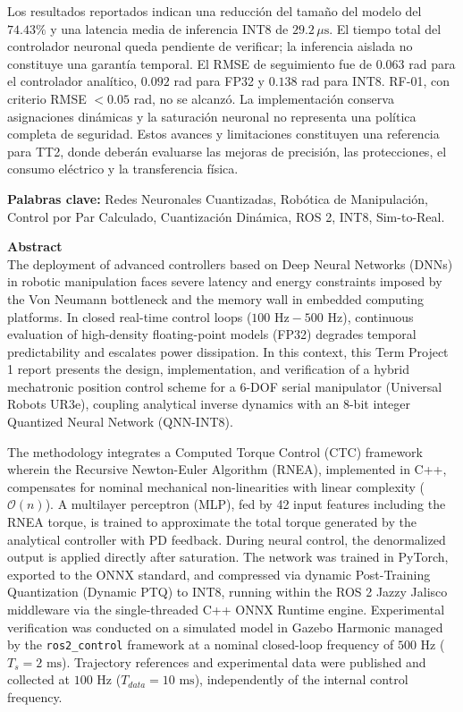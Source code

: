 \documentclass[12pt]{article}
\begin{document}
Los resultados reportados indican una reducción del tamaño del modelo del $74.43\%$ y una latencia media de inferencia INT8 de $29.2\,\mu\text{s}$. El tiempo total del controlador neuronal queda pendiente de verificar; la inferencia aislada no constituye una garantía temporal. El RMSE de seguimiento fue de $0.063$ rad para el controlador analítico, $0.092$ rad para FP32 y $0.138$ rad para INT8. RF-01, con criterio RMSE $<0.05$ rad, no se alcanzó. La implementación conserva asignaciones dinámicas y la saturación neuronal no representa una política completa de seguridad. Estos avances y limitaciones constituyen una referencia para TT2, donde deberán evaluarse las mejoras de precisión, las protecciones, el consumo eléctrico y la transferencia física.

\vspace{0.6cm}
\textbf{Palabras clave:} Redes Neuronales Cuantizadas, Robótica de Manipulación, Control por Par Calculado, Cuantización Dinámica, ROS 2, INT8, Sim-to-Real.

\vspace{1.0cm}
{\large \textbf{Abstract}}\\
The deployment of advanced controllers based on Deep Neural Networks (DNNs) in robotic manipulation faces severe latency and energy constraints imposed by the Von Neumann bottleneck and the memory wall in embedded computing platforms. In closed real-time control loops ($100\text{ Hz} - 500\text{ Hz}$), continuous evaluation of high-density floating-point models (FP32) degrades temporal predictability and escalates power dissipation. In this context, this Term Project 1 report presents the design, implementation, and verification of a hybrid mechatronic position control scheme for a 6-DOF serial manipulator (Universal Robots UR3e), coupling analytical inverse dynamics with an 8-bit integer Quantized Neural Network (QNN-INT8).

The methodology integrates a Computed Torque Control (CTC) framework wherein the Recursive Newton-Euler Algorithm (RNEA), implemented in C++, compensates for nominal mechanical non-linearities with linear complexity ($\mathcal{O}(n)$). A multilayer perceptron (MLP), fed by 42 input features including the RNEA torque, is trained to approximate the total torque generated by the analytical controller with PD feedback. During neural control, the denormalized output is applied directly after saturation. The network was trained in PyTorch, exported to the ONNX standard, and compressed via dynamic Post-Training Quantization (Dynamic PTQ) to INT8, running within the ROS 2 Jazzy Jalisco middleware via the single-threaded C++ ONNX Runtime engine. Experimental verification was conducted on a simulated model in Gazebo Harmonic managed by the \texttt{ros2\_control} framework at a nominal closed-loop frequency of $500\text{ Hz}$ ($T_s = 2\text{ ms}$). Trajectory references and experimental data were published and collected at $100\text{ Hz}$ ($T_{data}=10\text{ ms}$), independently of the internal control frequency.
\end{document}
